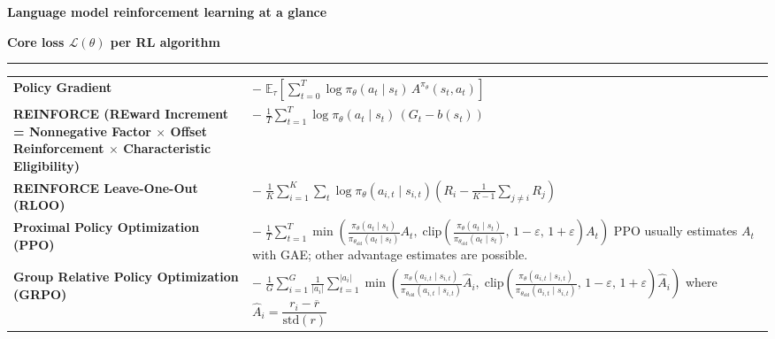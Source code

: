 \documentclass[9pt]{extarticle}
\begin{document}
\vspace*{\fill}
\begin{center}
{\Large\bfseries Language model reinforcement learning at a glance}
\end{center}

\vspace{4pt}
{\centering\textbf{Core loss $\mathcal{L}(\theta)$ per RL algorithm}\par}
\vspace{2pt}
\hrule
\vspace{6pt}

\begin{center}
\begin{tabularx}{0.92\textwidth}{>{\raggedright\arraybackslash\bfseries}p{5.8cm} @{\quad} X}

Policy Gradient
&
$\displaystyle -\;\mathbb{E}_\tau\!\left[\sum_{t=0}^{T} \log \pi_\theta(a_t\mid s_t)\, A^{\pi_\theta}(s_t, a_t)\right]$
\\[22pt]

REINFORCE
\newline\mdseries\scriptsize (REward Increment =
Nonnegative Factor $\times$
Offset Reinforcement $\times$
Characteristic Eligibility)
&
$\displaystyle -\;\frac{1}{T}\sum_{t=1}^{T}\log \pi_\theta(a_t\mid s_t)\,(G_t - b(s_t))$
\\[22pt]

REINFORCE Leave-One-Out
\newline\mdseries (RLOO)
&
$\displaystyle -\;\frac{1}{K}\sum_{i=1}^{K}\sum_t \log \pi_\theta(a_{i,t}\mid s_{i,t})\!\left(R_i - \frac{1}{K\!-\!1}\sum_{j\neq i}R_j\right)$
\\[22pt]

Proximal Policy Optimization
\newline\mdseries (PPO)
&
$\displaystyle -\;\frac{1}{T}\sum_{t=1}^{T}\min\!\left(\frac{\pi_\theta(a_t\mid s_t)}{\pi_{\theta_{\text{old}}}(a_t\mid s_t)} A_t,\; \mathrm{clip}\!\left(\frac{\pi_\theta(a_t\mid s_t)}{\pi_{\theta_{\text{old}}}(a_t\mid s_t)},\, 1\!-\!\varepsilon,\, 1\!+\!\varepsilon\right) A_t\right)$
\newline
{\scriptsize PPO usually estimates $A_t$ with GAE; other advantage estimates are possible.}
\\[20pt]

Group Relative Policy Optimization
\newline\mdseries (GRPO)
&
$\displaystyle -\;\frac{1}{G}\sum_{i=1}^{G}\frac{1}{|a_i|}\sum_{t=1}^{|a_i|}\min\!\left(\frac{\pi_\theta(a_{i,t}\mid s_{i,t})}{\pi_{\theta_{\text{old}}}(a_{i,t}\mid s_{i,t})} \hat{A}_i,\; \mathrm{clip}\!\left(\frac{\pi_\theta(a_{i,t}\mid s_{i,t})}{\pi_{\theta_{\text{old}}}(a_{i,t}\mid s_{i,t})},\, 1\!-\!\varepsilon,\, 1\!+\!\varepsilon\right) \hat{A}_i\right)$
\newline
where $\hat{A}_i = \dfrac{r_i - \overline{r}}{\mathrm{std}(r)}$
\\[40pt]


\end{tabularx}
\end{center}
\end{document}
